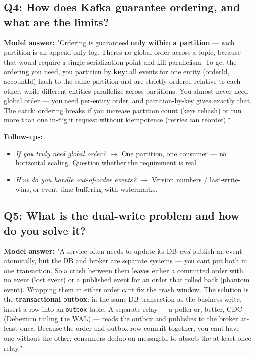 \documentclass[11pt]{article}
\providecommand{\tightlist}{\setlength{\itemsep}{1pt}\setlength{\parskip}{0pt}}
\begin{document}
\subsection{Q4: How does Kafka guarantee ordering, and what are the limits?}\label{q4-how-does-kafka-guarantee-ordering-and-what-are-the-limits}

\textbf{Model answer:} "Ordering is guaranteed \textbf{only within a partition} --- each partition is an append-only log. There\textquotesingle s no global order across a topic, because that would require a single serialization point and kill parallelism. To get the ordering you need, you partition by \textbf{key}: all events for one entity (orderId, accountId) hash to the same partition and are strictly ordered relative to each other, while different entities parallelize across partitions. You almost never need global order --- you need per-entity order, and partition-by-key gives exactly that. The catch: ordering breaks if you increase partition count (keys rehash) or run more than one in-flight request without idempotence (retries can reorder)."

\textbf{Follow-ups:}

\begin{itemize}
\tightlist
\item
  \emph{If you truly need global order?} \(\rightarrow\) One partition, one consumer --- no horizontal scaling. Question whether the requirement is real.
\item
  \emph{How do you handle out-of-order events?} \(\rightarrow\) Version numbers / last-write-wins, or event-time buffering with watermarks.
\end{itemize}

\subsection{Q5: What is the dual-write problem and how do you solve it?}\label{q5-what-is-the-dual-write-problem-and-how-do-you-solve-it}

\textbf{Model answer:} "A service often needs to update its DB \emph{and} publish an event atomically, but the DB and broker are separate systems --- you can\textquotesingle t put both in one transaction. So a crash between them leaves either a committed order with no event (lost event) or a published event for an order that rolled back (phantom event). Wrapping them in either order can\textquotesingle t fix the crash window. The solution is the \textbf{transactional outbox}: in the same DB transaction as the business write, insert a row into an \texttt{outbox} table. A separate relay --- a poller or, better, CDC (Debezium tailing the WAL) --- reads the outbox and publishes to the broker at-least-once. Because the order and outbox row commit together, you can\textquotesingle t have one without the other; consumers dedup on messageId to absorb the at-least-once relay."
\end{document}
